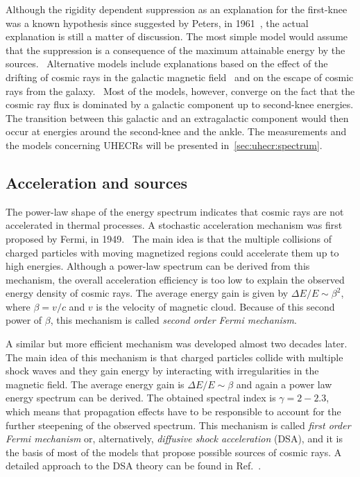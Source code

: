 Although the rigidity dependent suppression as an explanation for the first-knee
was a known hypothesis since suggested by Peters, in 1961~\cite{Peters1961},
the actual explanation is still a matter of discussion. The most simple
model would assume that the suppression is a consequence of the 
maximum attainable energy by the sources.~\cite{Gaisser:2013bla}  
Alternative models include explanations based on the effect of the
drifting of cosmic rays in the galactic magnetic field~\cite{Ptuskin1993,Candia:2002qd}
and on the escape of cosmic rays from the galaxy.~\cite{Giacinti:2014xya}
Most of the models, however, converge on the fact that
the cosmic ray flux is dominated by a galactic component up to second-knee energies.
The transition between this galactic and an extragalactic component would then occur
at energies around the second-knee and the ankle.
The measurements and the models concerning UHECRs
will be presented in~\cref{sec:uhecr:spectrum}.


\subsection{Acceleration and sources}


The power-law shape of the energy spectrum indicates that
cosmic rays are not accelerated in thermal processes.
A stochastic acceleration mechanism was first proposed
by Fermi, in 1949.~\cite{Fermi:1949ee} The main idea is that
the multiple collisions of charged particles with moving magnetized regions
could accelerate them up to high energies. 
Although a power-law spectrum can be derived from this mechanism,
the overall acceleration efficiency is too low to explain the observed
energy density of cosmic rays.
The average energy gain is given by $\Delta E/E\sim \beta^2$,
where $\beta = v/c$ and $v$ is the velocity of magnetic cloud.
Because of this second power of $\beta$, this mechanism is
called \emph{second order Fermi mechanism}.

A similar but more efficient mechanism was developed almost
two decades later.~\cite{Axford1977,Krymsky1977,Bell:1978zc,Blandford:1978ky}
The main idea of this mechanism is that charged particles collide with multiple shock waves
and they gain energy by interacting with irregularities in the magnetic field.
The average energy gain is $\Delta E/E\sim \beta$ and again a power law energy
spectrum can be derived. The obtained spectral index is $\gamma=2-2.3$, which means that
propagation effects have to be responsible to account for the further steepening
of the observed spectrum.
This mechanism is called \emph{first order Fermi mechanism} or, alternatively,
\emph{diffusive shock acceleration} (DSA), and it is the basis of most of the models
that propose possible sources of cosmic rays.
A detailed approach to the DSA theory can be found
in Ref.~\cite{Drury:1983zz}.

